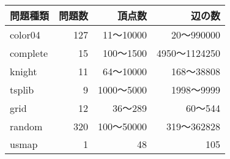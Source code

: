 \begin{table}[t]\normalsize
  \centering  
  \renewcommand{\arraystretch}{1.2}
  \begin{tabular}{l r||rr}\hline
    問題種類 & 問題数 & 頂点数 & 辺の数\\
    \hline
    \textsf{color04} & 127 & 11〜10000 & 20〜990000\\
    \textsf{complete} & 15 & 100〜1500 & 4950〜1124250 \\
    \textsf{knight} & 11 & 64〜10000 & 168〜38808 \\
    \textsf{tsplib} & 9 & 1000〜5000 & 1998〜9999 \\
    \textsf{grid} & 12 & 36〜289 & 60〜544 \\
    \textsf{random} & 320 & 100〜50000 & 319〜362828 \\
    \textsf{usmap} & 1 & 48 & 105\\
    \hline
  \end{tabular}
\end{table}
